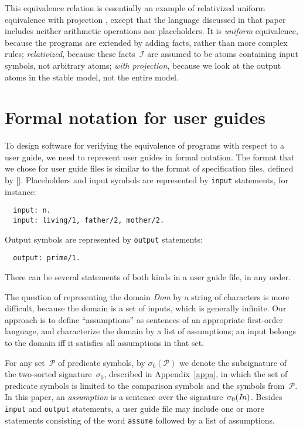 \documentclass{article}
\newcommand{\I}{\mathcal{I}}
\newcommand{\PP}{\mathcal{P}}
\begin{document}
This equivalence relation is essentially an
example of relativized uniform equivalence with projection
\cite{oet08}, except that the language discussed in that paper includes
neither arithmetic operations nor placeholders.
It is \emph{uniform} equivalence, because the programs are extended by
adding facts, rather than more complex rules; \emph{relativized},
because these
  facts~$\I$ are assumed to be atoms containing input symbols,
  not arbitrary atoms; \emph{with projection}, because
  we look at the output atoms in the stable model, not the entire model.

\section{Formal notation for user guides} \label{sec:fn}

To design software for verifying the equivalence of
programs with respect to a user guide, we need to
represent user guides in formal notation.   The format that we chose for
user guide files is similar to the format of
specification files, defined by \citeauthor{fan20} [\citeyear{fan20}].
Placeholders
and input symbols are represented by \verb|input| statements, for instance:
\begin{verbatim}
  input: n.
  input: living/1, father/2, mother/2.
\end{verbatim}
Output symbols are represented by \verb|output| statements:
\begin{verbatim}
  output: prime/1.
\end{verbatim}
There can be several statements of both kinds in a user guide file, in any
order.

The question of representing the domain \emph{Dom} by a string of
characters is more difficult, because the domain is a set of inputs,
which is generally infinite.
Our approach is to define ``assumptions'' as sentences of an
appropriate first-order language, and characterize the domain by a
list of assumptions; an input belongs to the domain iff it
satisfies all assumptions in that set.

For any set~$\PP$ of predicate symbols, by $\sigma_0(\PP)$ we denote the
subsignature of the two-sorted signature~$\sigma_0$, described in
Appendix~\ref{appa}, in which the set of predicate symbols
is limited to the comparison symbols and the symbols from~$\PP$.
In this paper, an \emph{assumption} is a sentence over the
signature~$\sigma_0(\emph{In\/})$.
Besides \verb|input| and \verb|output| statements, a user guide
file may include one or more statements consisting of the word
\verb|assume| followed by a list of assumptions.
\end{document}
